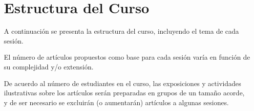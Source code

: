 \documentclass[11pt,a4paper,]{awesome-cv}
\begin{document}
\hypertarget{estructura-del-curso}{%
\section{Estructura del Curso}\label{estructura-del-curso}}

\begin{footnotesize}
A continuación se presenta la estructura del curso, incluyendo el tema de cada sesión. 

El número de artículos propuestos como base para cada sesión varía en función de su complejidad y/o extensión. 

De acuerdo al número de estudiantes en el curso, las exposiciones y actividades ilustrativas sobre los artículos serán preparadas en grupos de un tamaño acorde, y de ser necesario se excluirán (o aumentarán) artículos a algunas sesiones.  
\end{footnotesize}

\begingroup\fontsize{7.5}{9.5}\selectfont
\end{document}
